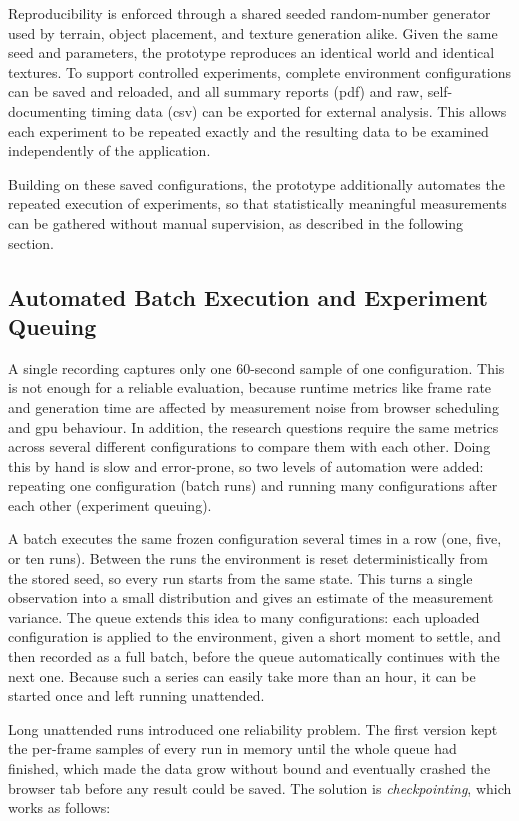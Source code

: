 Reproducibility is enforced through a shared seeded random-number generator used by terrain, object placement, and texture generation alike. Given the same seed and parameters, the prototype reproduces an identical world and identical textures. To support controlled experiments, complete environment configurations can be saved and reloaded, and all summary reports (\gls{pdf}) and raw, self-documenting timing data (\gls{csv}) can be exported for external analysis. This allows each experiment to be repeated exactly and the resulting data to be examined independently of the application.

\clearpage
Building on these saved configurations, the prototype additionally automates the repeated execution of experiments, so that statistically meaningful measurements can be gathered without manual supervision, as described in the following section.

\subsection{Automated Batch Execution and Experiment Queuing}

A single recording captures only one 60-second sample of one configuration. This is not enough for a reliable evaluation, because runtime metrics like frame rate and generation time are affected by measurement noise from browser scheduling and \gls{gpu} behaviour. In addition, the research questions require the same metrics across several different configurations to compare them with each other. Doing this by hand is slow and error-prone, so two levels of automation were added: repeating one configuration (batch runs) and running many configurations after each other (experiment queuing).

A batch executes the same frozen configuration several times in a row (one, five, or ten runs). Between the runs the environment is reset deterministically from the stored seed, so every run starts from the same state. This turns a single observation into a small distribution and gives an estimate of the measurement variance. The queue extends this idea to many configurations: each uploaded configuration is applied to the environment, given a short moment to settle, and then recorded as a full batch, before the queue automatically continues with the next one. Because such a series can easily take more than an hour, it can be started once and left running unattended.

Long unattended runs introduced one reliability problem. The first version kept the per-frame samples of every run in memory until the whole queue had finished, which made the data grow without bound and eventually crashed the browser tab before any result could be saved. The solution is \textit{checkpointing}, which works as follows:

